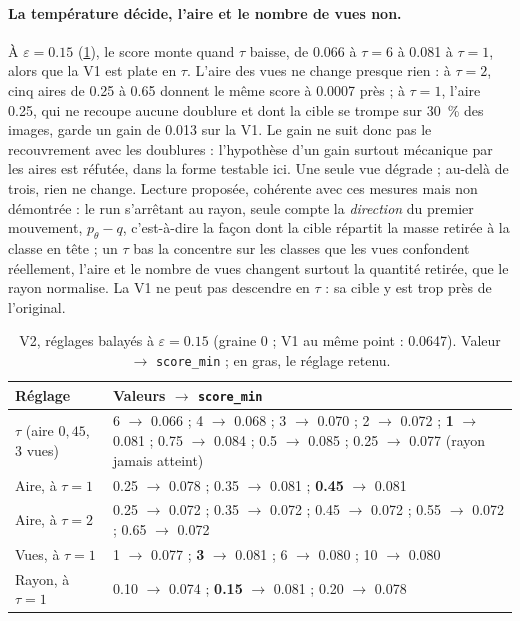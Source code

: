 \documentclass[11pt,a4paper]{article}
\newcommand{\code}[1]{\texttt{#1}}
\begin{document}
\paragraph{La température décide, l'aire et le nombre de vues non.} À $\varepsilon=\num{0.15}$
(\cref{tab:v2reglages}), le score monte quand $\tau$ baisse, de \num{0.066} à $\tau=6$ à
\num{0.081} à $\tau=1$, alors que la V1 est plate en $\tau$. L'aire des vues ne change presque rien :
à $\tau=2$, cinq aires de \num{0.25} à \num{0.65} donnent le même score à \num{0.0007} près ; à
$\tau=1$, l'aire \num{0.25}, qui ne recoupe aucune doublure et dont la cible se trompe sur
\SI{30}{\percent} des images, garde un gain de \num{0.013} sur la V1. Le gain ne suit donc pas le
recouvrement avec les doublures : l'hypothèse d'un gain surtout mécanique par les aires est
réfutée, dans la forme testable ici. Une seule vue dégrade ; au-delà de trois, rien ne change.
Lecture proposée, cohérente avec ces mesures mais non démontrée : le run s'arrêtant au rayon, seule
compte la \emph{direction} du premier mouvement, $p_\theta-q$, c'est-à-dire la façon dont la cible
répartit la masse retirée à la classe en tête ; un $\tau$ bas la concentre sur les classes que les
vues confondent réellement, l'aire et le nombre de vues changent surtout la quantité retirée, que
le rayon normalise. La V1 ne peut pas descendre en $\tau$ : sa cible y est trop près de l'original.

\begin{table}[ht]
  \centering\small
  \caption{V2, réglages balayés à $\varepsilon=\num{0.15}$ (graine 0 ; V1 au même point :
  \num{0.0647}). Valeur $\to$ \code{score\_min} ; en gras, le réglage retenu.}\label{tab:v2reglages}
  \begin{tabularx}{\linewidth}{@{}>{\raggedright}p{3.4cm}X@{}}
    \toprule
    Réglage & Valeurs $\to$ \code{score\_min}\\
    \midrule
    $\tau$ (aire $0{,}45$, 3 vues) & 6 $\to$ \num{0.066} ; 4 $\to$ \num{0.068} ; 3 $\to$ \num{0.070} ;
      2 $\to$ \num{0.072} ; \textbf{1} $\to$ \num{0.081} ; \num{0.75} $\to$ \num{0.084} ;
      \num{0.5} $\to$ \num{0.085} ; \num{0.25} $\to$ \num{0.077} (rayon jamais atteint)\\
    Aire, à $\tau=1$ & \num{0.25} $\to$ \num{0.078} ; \num{0.35} $\to$ \num{0.081} ;
      \textbf{\num{0.45}} $\to$ \num{0.081}\\
    Aire, à $\tau=2$ & \num{0.25} $\to$ \num{0.072} ; \num{0.35} $\to$ \num{0.072} ; \num{0.45} $\to$
      \num{0.072} ; \num{0.55} $\to$ \num{0.072} ; \num{0.65} $\to$ \num{0.072}\\
    Vues, à $\tau=1$ & 1 $\to$ \num{0.077} ; \textbf{3} $\to$ \num{0.081} ; 6 $\to$ \num{0.080} ;
      10 $\to$ \num{0.080}\\
    Rayon, à $\tau=1$ & \num{0.10} $\to$ \num{0.074} ; \textbf{\num{0.15}} $\to$ \num{0.081} ;
      \num{0.20} $\to$ \num{0.078}\\
    \bottomrule
  \end{tabularx}
\end{table}
\end{document}

